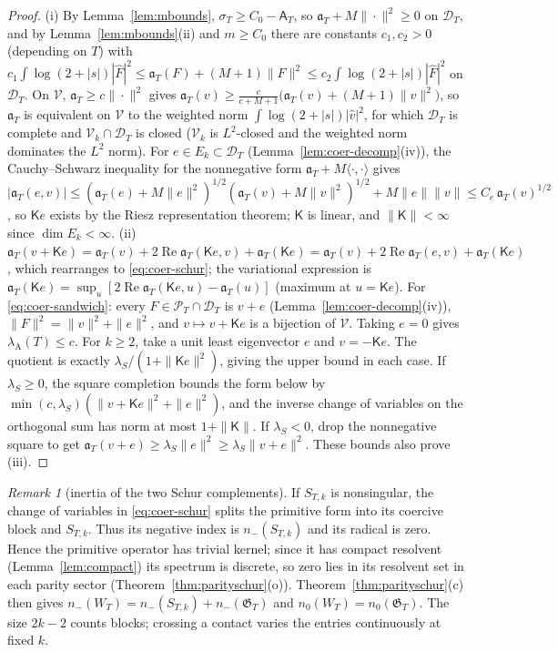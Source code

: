 \documentclass[10pt]{amsart}
\theoremstyle{definition}
\theoremstyle{remark}
\newtheorem{remark}[theorem]{Remark}
\newcommand{\Rel}{\operatorname{Re}}
\newcommand{\PT}{\mathcal P_T}
\newcommand{\lamA}{\lambda_{\mathrm A}(T)}
\newcommand{\Fh}{\widehat F}
\newcommand{\Aconst}{\mathsf A_T}
\begin{document}
\begin{proof}
(i) By Lemma~\ref{lem:mbounds}, $\sigma_T\ge C_0-\Aconst$, so $\mathfrak a_T+M\|\cdot\|^2\ge0$ on $\mathcal D_T$, and
by Lemma~\ref{lem:mbounds}(ii) and $m\ge C_0$ there are constants $c_1,c_2>0$ (depending on $T$) with
$c_1\int\log(2+|s|)|\Fh|^2\le\mathfrak a_T(F)+(M+1)\|F\|^2\le c_2\int\log(2+|s|)|\Fh|^2$ on $\mathcal D_T$. On $\mathcal V$,
$\mathfrak a_T\ge c\|\cdot\|^2$ gives $\mathfrak a_T(v)\ge\frac c{c+M+1}\big(\mathfrak a_T(v)+(M+1)\|v\|^2\big)$, so
$\mathfrak a_T$ is equivalent on $\mathcal V$ to the weighted norm $\int\log(2+|s|)|\widehat v|^2$, for which
$\mathcal D_T$ is complete and $\mathcal V_k\cap\mathcal D_T$ is closed ($\mathcal V_k$ is $L^2$-closed and the weighted norm
dominates the $L^2$ norm). For $e\in E_k\subset\mathcal D_T$ (Lemma~\ref{lem:coer-decomp}(iv)), the Cauchy--Schwarz
inequality for the nonnegative form $\mathfrak a_T+M\langle\cdot,\cdot\rangle$ gives
$|\mathfrak a_T(e,v)|\le(\mathfrak a_T(e)+M\|e\|^2)^{1/2}(\mathfrak a_T(v)+M\|v\|^2)^{1/2}+M\|e\|\|v\|\le C_e\,\mathfrak a_T(v)^{1/2}$,
so $\mathsf Ke$ exists by the Riesz representation theorem; $\mathsf K$ is linear, and $\|\mathsf K\|<\infty$ since $\dim E_k<\infty$.
(ii) $\mathfrak a_T(v+\mathsf Ke)=\mathfrak a_T(v)+2\Rel\mathfrak a_T(\mathsf Ke,v)+\mathfrak a_T(\mathsf Ke)=\mathfrak a_T(v)+2\Rel\mathfrak a_T(e,v)+\mathfrak a_T(\mathsf Ke)$,
which rearranges to \eqref{eq:coer-schur}; the variational expression is $\mathfrak a_T(\mathsf Ke)=\sup_u[2\Rel\mathfrak a_T(\mathsf Ke,u)-\mathfrak a_T(u)]$
(maximum at $u=\mathsf Ke$). For \eqref{eq:coer-sandwich}: every $F\in\PT\cap\mathcal D_T$ is $v+e$ (Lemma~\ref{lem:coer-decomp}(iv)),
$\|F\|^2=\|v\|^2+\|e\|^2$, and $v\mapsto v+\mathsf Ke$ is a bijection of $\mathcal V$. Taking $e=0$ gives $\lamA\le c$. For $k\ge2$, take a unit least
eigenvector $e$ and $v=-\mathsf Ke$. The quotient is exactly
$\lambda_S/(1+\|\mathsf Ke\|^2)$, giving the upper bound in each case.
If $\lambda_S\ge0$, the square completion bounds the form below by
$\min(c,\lambda_S)(\|v+\mathsf Ke\|^2+\|e\|^2)$, and the inverse
change of variables on the orthogonal sum has norm at most $1+\|\mathsf K\|$.
If $\lambda_S<0$, drop the nonnegative square to get
$\mathfrak a_T(v+e)\ge\lambda_S\|e\|^2\ge\lambda_S\|v+e\|^2$.
These bounds also prove (iii).
\end{proof}

\begin{remark}[inertia of the two Schur complements]\label{rem:inertiatower}
If $S_{T,k}$ is nonsingular, the change of variables in
\eqref{eq:coer-schur} splits the primitive form into its coercive block
and $S_{T,k}$. Thus its negative index is $n_-(S_{T,k})$ and its radical
is zero. Hence the primitive operator has trivial kernel; since it has compact resolvent
(Lemma~\ref{lem:compact}) its spectrum is discrete, so zero lies in its resolvent set in each
parity sector (Theorem~\ref{thm:parityschur}(o)). Theorem~\ref{thm:parityschur}(c) then gives
$n_-(W_T)=n_-(S_{T,k})+n_-(\mathfrak G_T)$ and
$n_0(W_T)=n_0(\mathfrak G_T)$. The size $2k-2$ counts blocks;
crossing a contact varies the entries continuously at fixed $k$.
\end{remark}
\end{document}
